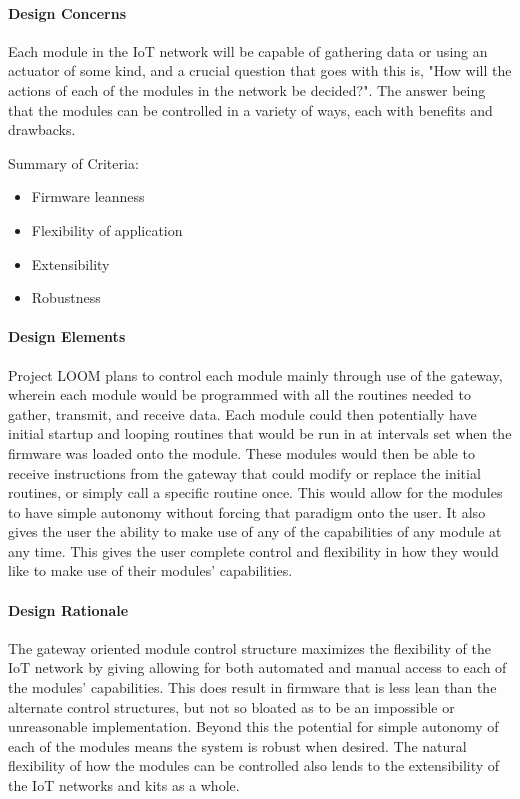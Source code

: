 \documentclass[onecolumn, draftclsnofoot,10pt, compsoc]{IEEEtran}
\begin{document}
\paragraph{Design Concerns}
    Each module in the IoT network will be capable of gathering data or using an actuator of some kind, and a crucial question that goes with this is, "How will the actions of each of the modules in the network be decided?". The answer being that the modules can be controlled in a variety of ways, each with benefits and drawbacks.

    Summary of Criteria: 
    \begin{itemize}[noitemsep,topsep=-10pt]
        \item Firmware leanness
        \item Flexibility of application
        \item Extensibility
        \item Robustness
    \end{itemize}

\paragraph{Design Elements}
    Project LOOM plans to control each module mainly through use of the gateway, wherein each module would be programmed with all the routines needed to gather, transmit, and receive data. Each module could then potentially have initial startup and looping routines that would be run in at intervals set when the firmware was loaded onto the module. These modules would then be able to receive instructions from the gateway that could modify or replace the initial routines, or simply call a specific routine once. This would allow for the modules to have simple autonomy without forcing that paradigm onto the user. It also gives the user the ability to make use of any of the capabilities of any module at any time. This gives the user complete control and flexibility in how they would like to make use of their modules' capabilities.

\paragraph{Design Rationale}
    The gateway oriented module control structure maximizes the flexibility of the IoT network by giving allowing for both automated and manual access to each of the modules' capabilities. This does result in firmware that is less lean than the alternate control structures, but not so bloated as to be an impossible or unreasonable implementation. Beyond this the potential for simple autonomy of each of the modules means the system is robust when desired. The natural flexibility of how the modules can be controlled also lends to the extensibility of the IoT networks and kits as a whole. 
\end{document}
